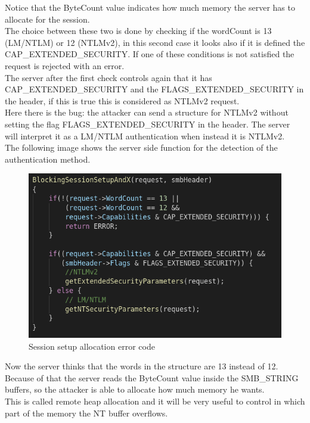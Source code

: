 \noindent Notice that the ByteCount value indicates how much memory the server has to allocate for the session.\\
\noindent The choice between these two is done by checking 
if the wordCount is 13 (LM/NTLM) or 12 (NTLMv2), in this second case it looks also if it is defined the 
CAP\_EXTENDED\_SECURITY. If one of these conditions is not satisfied the request is rejected with an error.\\
The server after the first check controls again that it has CAP\_EXTENDED\_SECURITY and the
FLAGS\_EXTENDED\_SECURITY in the header, if this is true this is considered as NTLMv2 request.\\
\noindent Here there is the bug\cite{eternalblue-checkpoint}: the attacker can send a structure for NTLMv2 without setting the flag FLAGS\_EXTENDED\_SECURITY in the 
header. The server will interpret it as a LM/NTLM authentication when instead it is NTLMv2.\\
The following image shows the server side function for the detection of the authentication method.

\begin{figure}[ht!]
  \centering
    \includegraphics[scale=0.35]{images/auth_vuln_code.png}
    \caption{Session setup allocation error code}
\end{figure}

\noindent Now the server thinks that the words in the structure are 13 instead of 12. Because of that the server reads the ByteCount value inside the 
SMB\_STRING buffers, so the attacker is able to allocate how much memory he wants. \\
This is called remote heap allocation and it will be very useful to control in which part of the memory the NT buffer overflows.